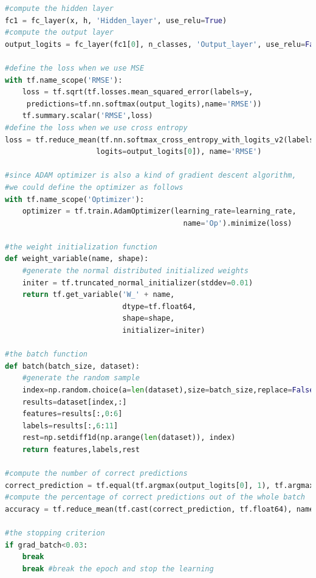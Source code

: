 \documentclass{article}
\begin{document}
\begin{lstlisting}[language=Python]
#compute the hidden layer
fc1 = fc_layer(x, h, 'Hidden_layer', use_relu=True)
#compute the output layer
output_logits = fc_layer(fc1[0], n_classes, 'Output_layer', use_relu=False)

#define the loss when we use MSE
with tf.name_scope('RMSE'):
    loss = tf.sqrt(tf.losses.mean_squared_error(labels=y,
     predictions=tf.nn.softmax(output_logits),name='RMSE'))
    tf.summary.scalar('RMSE',loss)
#define the loss when we use cross entropy
loss = tf.reduce_mean(tf.nn.softmax_cross_entropy_with_logits_v2(labels=y,
                     logits=output_logits[0]), name='RMSE')

#since ADAM optimizer is also a kind of gradient descent algorithm,
#we could define the optimizer as follows
with tf.name_scope('Optimizer'):
    optimizer = tf.train.AdamOptimizer(learning_rate=learning_rate,
                                         name='Op').minimize(loss)

#the weight initialization function
def weight_variable(name, shape):
    #generate the normal distributed initialized weights
    initer = tf.truncated_normal_initializer(stddev=0.01)
    return tf.get_variable('W_' + name,
                           dtype=tf.float64,
                           shape=shape,
                           initializer=initer)

#the batch function
def batch(batch_size, dataset):
    #generate the random sample
    index=np.random.choice(a=len(dataset),size=batch_size,replace=False)
    results=dataset[index,:]
    features=results[:,0:6]
    labels=results[:,6:11]
    rest=np.setdiff1d(np.arange(len(dataset)), index)
    return features,labels,rest

#compute the number of correct predictions
correct_prediction = tf.equal(tf.argmax(output_logits[0], 1), tf.argmax(y, 1), name='co_pre')
#compute the percentage of correct predictions out of the whole batch
accuracy = tf.reduce_mean(tf.cast(correct_prediction, tf.float64), name='accuracy')

#the stopping criterion
if grad_batch<0.03:
    break
    break #break the epoch and stop the learning
\end{lstlisting}
\end{document}
